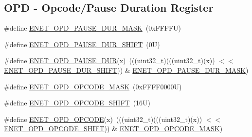 \subsection*{O\+PD -\/ Opcode/\+Pause Duration Register}
\begin{DoxyCompactItemize}
\item 
\#define \mbox{\hyperlink{group___e_n_e_t___register___masks_ga1c63364c148916da71bb917ea8d96adf}{E\+N\+E\+T\+\_\+\+O\+P\+D\+\_\+\+P\+A\+U\+S\+E\+\_\+\+D\+U\+R\+\_\+\+M\+A\+SK}}~(0x\+F\+F\+F\+F\+U)
\item 
\#define \mbox{\hyperlink{group___e_n_e_t___register___masks_ga0cd72f21fa65e5ce01260fdf303bc9e2}{E\+N\+E\+T\+\_\+\+O\+P\+D\+\_\+\+P\+A\+U\+S\+E\+\_\+\+D\+U\+R\+\_\+\+S\+H\+I\+FT}}~(0\+U)
\item 
\#define \mbox{\hyperlink{group___e_n_e_t___register___masks_ga541dcbba44e5eff5ae1d0cb74b5a55af}{E\+N\+E\+T\+\_\+\+O\+P\+D\+\_\+\+P\+A\+U\+S\+E\+\_\+\+D\+UR}}(x)~(((uint32\+\_\+t)(((uint32\+\_\+t)(x)) $<$$<$ \mbox{\hyperlink{group___e_n_e_t___register___masks_ga0cd72f21fa65e5ce01260fdf303bc9e2}{E\+N\+E\+T\+\_\+\+O\+P\+D\+\_\+\+P\+A\+U\+S\+E\+\_\+\+D\+U\+R\+\_\+\+S\+H\+I\+FT}})) \& \mbox{\hyperlink{group___e_n_e_t___register___masks_ga1c63364c148916da71bb917ea8d96adf}{E\+N\+E\+T\+\_\+\+O\+P\+D\+\_\+\+P\+A\+U\+S\+E\+\_\+\+D\+U\+R\+\_\+\+M\+A\+SK}})
\item 
\#define \mbox{\hyperlink{group___e_n_e_t___register___masks_ga91f8d538d8541612f56f3a8e42d99c92}{E\+N\+E\+T\+\_\+\+O\+P\+D\+\_\+\+O\+P\+C\+O\+D\+E\+\_\+\+M\+A\+SK}}~(0x\+F\+F\+F\+F0000\+U)
\item 
\#define \mbox{\hyperlink{group___e_n_e_t___register___masks_ga775f746ec6513ddb5be567b51b1b8c1b}{E\+N\+E\+T\+\_\+\+O\+P\+D\+\_\+\+O\+P\+C\+O\+D\+E\+\_\+\+S\+H\+I\+FT}}~(16\+U)
\item 
\#define \mbox{\hyperlink{group___e_n_e_t___register___masks_gac6895ba9997a60b06b3a1a85e18259e7}{E\+N\+E\+T\+\_\+\+O\+P\+D\+\_\+\+O\+P\+C\+O\+DE}}(x)~(((uint32\+\_\+t)(((uint32\+\_\+t)(x)) $<$$<$ \mbox{\hyperlink{group___e_n_e_t___register___masks_ga775f746ec6513ddb5be567b51b1b8c1b}{E\+N\+E\+T\+\_\+\+O\+P\+D\+\_\+\+O\+P\+C\+O\+D\+E\+\_\+\+S\+H\+I\+FT}})) \& \mbox{\hyperlink{group___e_n_e_t___register___masks_ga91f8d538d8541612f56f3a8e42d99c92}{E\+N\+E\+T\+\_\+\+O\+P\+D\+\_\+\+O\+P\+C\+O\+D\+E\+\_\+\+M\+A\+SK}})
\end{DoxyCompactItemize}
